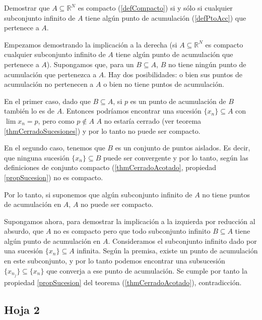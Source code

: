 \begin{problem}[7] Demostrar que $A⊆ℝ^N$ es compacto (\ref{defCompacto}) si y sólo si cualquier subconjunto infinito de $A$ tiene algún punto de acumulación (\ref{defPtoAcc}) que pertenece a $A$.

\solution

Empezamos demostrando la implicación a la derecha (si $A⊆ℝ^N$ es compacto cualquier subconjunto infinito de $A$ tiene algún punto de acumulación que pertenece a $A$). Supongamos que, para un $B⊆A$, $B$ no tiene ningún punto de acumulación que pertenezca a $A$. Hay dos posibilidades: o bien sus puntos de acumulación no pertenecen a $A$ o bien no tiene puntos de acumulación.

En el primer caso, dado que $B⊆A$, si $p$ es un punto de acumulación de $B$ también lo es de $A$. Entonces podríamos encontrar una sucesión $\{x_n\} ⊆ A$ con $\lim x_n = p$, pero como $p\notin A$ $A$ no estaría cerrado (ver teorema \ref{thmCerradoSucesiones}) y por lo tanto no puede ser compacto.

En el segundo caso, tenemos que $B$ es un conjunto de puntos aislados. Es decir, que ninguna sucesión $\{x_n\} ⊆ B$ puede ser convergente y por lo tanto, según las definiciones de conjunto compacto (\ref{thmCerradoAcotado}, propiedad \ref{propSucesion}) no es compacto.

Por lo tanto, si suponemos que algún subconjunto infinito de $A$ no tiene puntos de acumulación en $A$, $A$ no puede ser compacto. 

Supongamos ahora, para demostrar la implicación a la izquierda por reducción al absurdo, que $A$ no es compacto pero que todo subconjunto infinito $B⊆A$ tiene algún punto de acumulación en $A$. Consideramos el subconjunto infinito dado por una sucesión $\{x_n\} ⊆ A$ infinita. Según la premisa, existe un punto de acumulación en este subconjunto, y por lo tanto podemos encontrar una subsucesión $\{x_{n_j}\}⊆\{x_n\}$ que converja a ese punto de acumulación. Se cumple por tanto la propiedad \ref{propSucesion} del teorema (\ref{thmCerradoAcotado}), contradicción.


\end{problem}

\subsection{Hoja 2}

